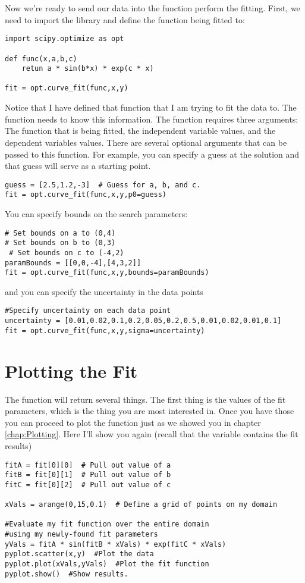 Now we're ready to send our data into the function 
perform the fitting. First, we need to import the library and define
the function being fitted to:
\begin{Verbatim}
import scipy.optimize as opt

def func(x,a,b,c)
    retun a * sin(b*x) * exp(c * x)

fit = opt.curve_fit(func,x,y)
\end{Verbatim}
Notice that I have defined that function that I am trying to fit the
data to.  The  function needs to know this information.
The  function requires three arguments: The function
that is being fitted, the independent variable values, and the
dependent variables values.  There are several optional arguments that
can be passed to this function.  For example, you can specify a guess
at the solution and that guess will serve as a starting
point.
\begin{Verbatim}
guess = [2.5,1.2,-3]  # Guess for a, b, and c.
fit = opt.curve_fit(func,x,y,p0=guess)
\end{Verbatim}
You can specify bounds on the search parameters:
\begin{Verbatim}
# Set bounds on a to (0,4)
# Set bounds on b to (0,3)
 # Set bounds on c to (-4,2)
paramBounds = [[0,0,-4],[4,3,2]] 
fit = opt.curve_fit(func,x,y,bounds=paramBounds)
\end{Verbatim}
and you can specify the uncertainty in the data points
\begin{Verbatim}
#Specify uncertainty on each data point
uncertainty = [0.01,0.02,0.1,0.2,0.05,0.2,0.5,0.01,0.02,0.01,0.1]  
fit = opt.curve_fit(func,x,y,sigma=uncertainty)
\end{Verbatim}

\section{Plotting the Fit}
The function  will return several things.  The
first thing is the values of the fit parameters, which is the thing
you are most interested in.  Once you have those you can proceed to
plot the function just as we showed you in chapter \ref{chap:Plotting}.
Here I'll show you again (recall that the variable 
contains the fit results)
\begin{Verbatim}
fitA = fit[0][0]  # Pull out value of a
fitB = fit[0][1]  # Pull out value of b
fitC = fit[0][2]  # Pull out value of c

xVals = arange(0,15,0.1)  # Define a grid of points on my domain

#Evaluate my fit function over the entire domain
#using my newly-found fit parameters
yVals = fitA * sin(fitB * xVals) * exp(fitC * xVals)
pyplot.scatter(x,y)  #Plot the data
pyplot.plot(xVals,yVals)  #Plot the fit function
pyplot.show()  #Show results.
\end{Verbatim}
